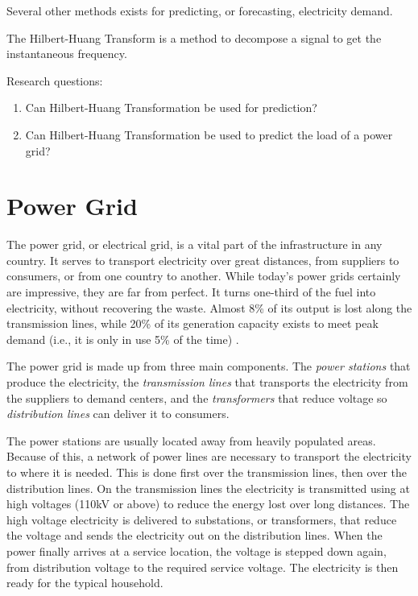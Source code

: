 \documentclass[12pt]{article}
\begin{document}
Several other methods exists for predicting, or forecasting, electricity demand. 

The Hilbert-Huang Transform is a method to decompose a signal to get the instantaneous frequency. 



Research questions:
\begin{enumerate}
\item Can Hilbert-Huang Transformation be used for prediction?
\item Can Hilbert-Huang Transformation be used to predict the load of a power grid?
\end{enumerate}

\section{Power Grid}
\label{powerGrid}
The power grid, or electrical grid, is a vital part of the infrastructure in any country. It serves to transport electricity over great distances, from suppliers to consumers, or from one country to another. While today's power grids certainly are impressive, they are far from perfect. It turns one-third of the fuel into electricity, without recovering the waste. Almost 8\% of its output is lost along the transmission lines, while 20\% of its generation capacity exists to meet peak demand (i.e., it is only in use 5\% of the time) \cite{smartgridPath}.

The power grid is made up from three main components. The \textit{power stations} that produce the electricity, the \textit{transmission lines} that transports the electricity from the suppliers to demand centers, and the \textit{transformers} that reduce voltage so \textit{distribution lines} can deliver it to consumers.

The power stations are usually located away from heavily populated areas. Because of this, a network of power lines are necessary to transport the electricity to where it is needed. This is done first over the transmission lines, then over the distribution lines. On the transmission lines the electricity is transmitted using at high voltages (110kV or above) to reduce the energy lost over long distances. The high voltage electricity is delivered to substations, or transformers, that reduce the voltage and sends the electricity out on the distribution lines. When the power finally arrives at a service location, the voltage is stepped down again, from distribution voltage to the required service voltage. The electricity is then ready for the typical household. 
\end{document}
